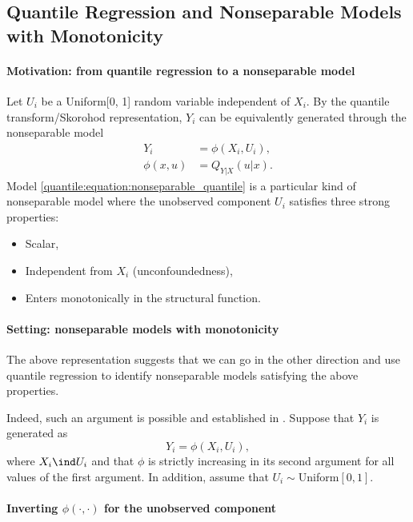 \subsection{Quantile Regression and Nonseparable Models with Monotonicity}
 
 \paragraph{Motivation: from quantile regression to a nonseparable model}
    
   Let $U_i$ be a Uniform[0, 1] random variable independent of $X_i$.  By the quantile transform/Skorohod representation, $Y_i$ can be equivalently generated through the nonseparable model
   \begin{align}\label{quantile:equation:nonseparable_quantile}
   	 Y_i & = \phi(X_i, U_i), \\
   	 \phi(x, u)  & =  Q_{Y|X}(u|x).
   \end{align}
   Model \eqref{quantile:equation:nonseparable_quantile} is a particular kind of nonseparable model  where the unobserved component $U_i$ satisfies three strong properties:
   \begin{itemize}
   	\item Scalar,
   	\item Independent from $X_i$ (unconfoundedness),
   	\item Enters monotonically in the structural function.
   \end{itemize} 
   
   
  \paragraph{Setting: nonseparable models with monotonicity} 
   
   The above representation suggests that we can go in the other direction and use quantile regression to identify nonseparable models satisfying  the above properties. 
   
   Indeed, such an argument is possible and established  in \cite{Matzkin2003}. Suppose that $Y_i$ is generated as 
   \begin{equation}
   	Y_i  = \phi(X_i, U_i),
   \end{equation}
   where $X_i\ind U_i$ and that $\phi$ is strictly increasing in its second argument for all values of the first argument. In addition, assume that $U_i\sim$Uniform$[0, 1]$.
   
   \paragraph{Inverting $\phi(\cdot, \cdot)$ for the unobserved component}
   
